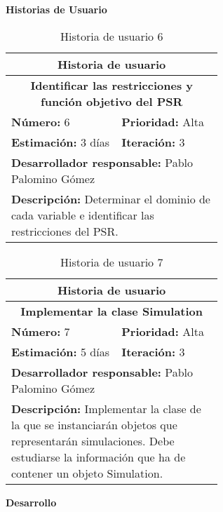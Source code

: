 \textbf{Historias de Usuario}\\
\begin{table}[H]
        \centering
        \begin{tabular}{|p{0.3\linewidth}|p{0.3\linewidth}|}
          \hline
          \multicolumn{2}{|c|}{Historia de usuario}\\ \hline
          \multicolumn{2}{|c|}{\textbf{Identificar las restricciones y función objetivo del PSR}}\\ \hline
          \textbf{Número:} 6 & \textbf{Prioridad:} Alta\\ \hline
          \textbf{Estimación:} 3 días & \textbf{Iteración:} 3\\ \hline
          \multicolumn{2}{|l|}{\textbf{Desarrollador responsable:} Pablo Palomino Gómez}\\ \hline
          \multicolumn{2}{|p{0.6\linewidth}|}{\textbf{Descripción:} Determinar el dominio de cada variable e identificar las restricciones del \gls{PSR}.}\\ \hline
        \end{tabular}
        \caption{Historia de usuario 6}
        \label{tab:hist6}
\end{table}
\begin{table}[H]
        \centering
        \begin{tabular}{|p{0.3\linewidth}|p{0.3\linewidth}|}
          \hline
          \multicolumn{2}{|c|}{Historia de usuario}\\ \hline
          \multicolumn{2}{|c|}{\textbf{Implementar la clase Simulation }}\\ \hline
          \textbf{Número:} 7 & \textbf{Prioridad:} Alta\\ \hline
          \textbf{Estimación:} 5 días & \textbf{Iteración:} 3\\ \hline
          \multicolumn{2}{|l|}{\textbf{Desarrollador responsable:} Pablo Palomino Gómez}\\ \hline
          \multicolumn{2}{|p{0.6\linewidth}|}{\textbf{Descripción:} Implementar la clase de la que se instanciarán objetos que representarán simulaciones. Debe estudiarse la información que ha de contener un objeto Simulation.}\\ \hline
        \end{tabular}
        \caption{Historia de usuario 7}
        \label{tab:hist7}
\end{table}
\textbf{Desarrollo}\\


